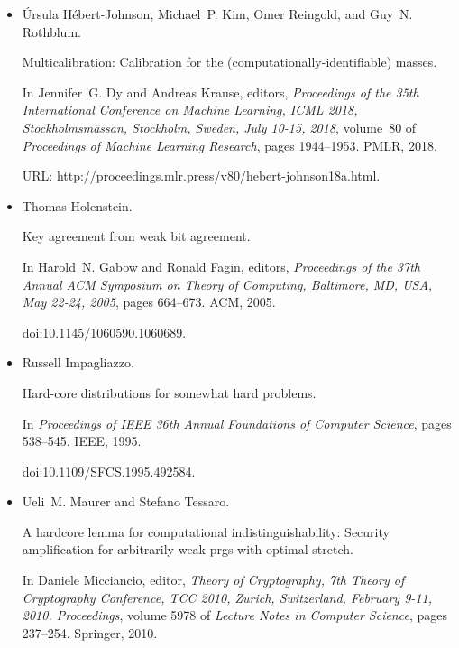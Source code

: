 \begin{itemize}
\item[] 
[10]

Úrsula Hébert-Johnson, Michael P. Kim, Omer Reingold, and Guy N.
Rothblum.


Multicalibration: Calibration for the (computationally-identifiable)
masses.


In Jennifer G. Dy and Andreas Krause, editors, \emph{Proceedings of
the 35th International Conference on Machine Learning, ICML 2018,
Stockholmsmässan, Stockholm, Sweden, July 10-15, 2018}, volume 80 of
\emph{Proceedings of Machine Learning Research}, pages 1944–1953. PMLR,
2018.


URL: http://proceedings.mlr.press/v80/hebert-johnson18a.html.





\item[] 
[11]

Thomas Holenstein.


Key agreement from weak bit agreement.


In Harold N. Gabow and Ronald Fagin, editors, \emph{Proceedings of the
37th Annual ACM Symposium on Theory of Computing, Baltimore, MD, USA, May
22-24, 2005}, pages 664–673. ACM, 2005.


doi:10.1145/1060590.1060689.





\item[] 
[12]

Russell Impagliazzo.


Hard-core distributions for somewhat hard problems.


In \emph{Proceedings of IEEE 36th Annual Foundations of Computer
Science}, pages 538–545. IEEE, 1995.


doi:10.1109/SFCS.1995.492584.





\item[] 
[13]

Ueli M. Maurer and Stefano Tessaro.


A hardcore lemma for computational indistinguishability: Security
amplification for arbitrarily weak prgs with optimal stretch.


In Daniele Micciancio, editor, \emph{Theory of Cryptography, 7th
Theory of Cryptography Conference, TCC 2010, Zurich, Switzerland, February
9-11, 2010. Proceedings}, volume 5978 of \emph{Lecture Notes in Computer
Science}, pages 237–254. Springer, 2010.



\end{itemize}
